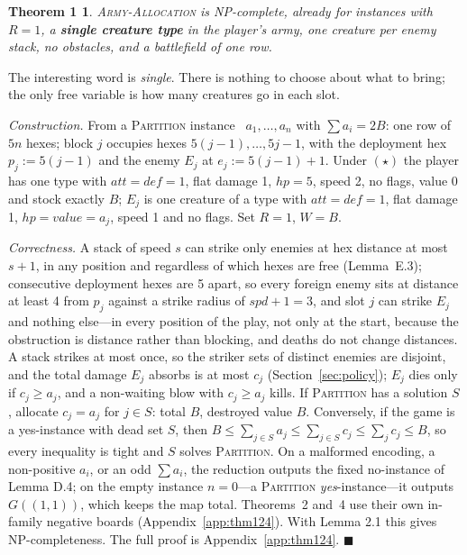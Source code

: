 \documentclass[11pt,a4paper]{article}
\theoremstyle{plain}
\newtheorem*{thmone}{Theorem 1}
\theoremstyle{definition}
\theoremstyle{plain}
\theoremstyle{definition}
\theoremstyle{remark}
\newcommand{\ALLOC}{\textsc{Army-Allocation}}
\newcommand{\PARTITION}{\textsc{Partition}}
\newcommand{\qedbox}{\hfill$\blacksquare$}
\begin{document}
\begin{thmone}
\ALLOC{} is NP-complete, already for instances with $R=1$, a \textbf{single creature type} in
the player's army, one creature per enemy stack, no obstacles, and a battlefield of one row.
\end{thmone}

The interesting word is \emph{single}. There is nothing to choose about what to bring; the only
free variable is how many creatures go in each slot.

\smallskip
\noindent\emph{Construction.} From a \PARTITION{} instance~\cite[SP12]{GJ79}
$a_1,\dots,a_n$ with $\sum a_i=2B$: one row of $5n$ hexes; block $j$ occupies hexes
$5(j-1),\dots,5j-1$, with the deployment hex $p_j:=5(j-1)$ and the enemy $E_j$ at
$e_j:=5(j-1)+1$. Under $(\star)$ the player has one type with
$\mathit{att}=\mathit{def}=1$, flat damage 1, $\mathit{hp}=5$, speed 2, no flags, value $0$
and stock exactly $B$; $E_j$ is one creature of a type with $\mathit{att}=\mathit{def}=1$,
flat damage 1, $\mathit{hp}=\mathit{value}=a_j$, speed 1 and no flags. Set $R=1$, $W=B$.

\smallskip
\noindent\emph{Correctness.} A stack of speed $s$ can strike only enemies at hex distance at
most $s+1$, in any position and regardless of which hexes are free (Lemma~E.3); consecutive
deployment hexes are 5 apart, so every foreign enemy sits at distance at least 4 from $p_j$
against a strike radius of $\mathit{spd}+1=3$, and slot $j$ can strike $E_j$ and nothing
else---in every position of the play, not only at the start, because the obstruction is
distance rather than blocking, and deaths do not change distances. A stack strikes at most
once, so the striker sets of distinct enemies are disjoint, and the total damage $E_j$
absorbs is at most $c_j$ (Section~\ref{sec:policy}); $E_j$ dies only if $c_j\ge a_j$, and a
non-waiting blow with $c_j\ge a_j$ kills. If \PARTITION{} has a solution $S$, allocate
$c_j=a_j$ for $j\in S$: total $B$, destroyed value $B$. Conversely, if the game is a
yes-instance with dead set $S$, then
$B\le\sum_{j\in S}a_j\le\sum_{j\in S}c_j\le\sum_j c_j\le B$, so every inequality is tight and
$S$ solves \PARTITION. On a malformed encoding, a non-positive $a_i$, or an odd $\sum a_i$, the
reduction outputs the fixed no-instance of Lemma D.4; on the empty instance $n=0$---a
\PARTITION{} \emph{yes}-instance---it outputs $G((1,1))$, which keeps the map total. Theorems~2 and~4 use their own in-family negative boards (Appendix~\ref{app:thm124}). With Lemma 2.1 this gives NP-completeness. The full proof is Appendix~\ref{app:thm124}. \qedbox
\end{document}
